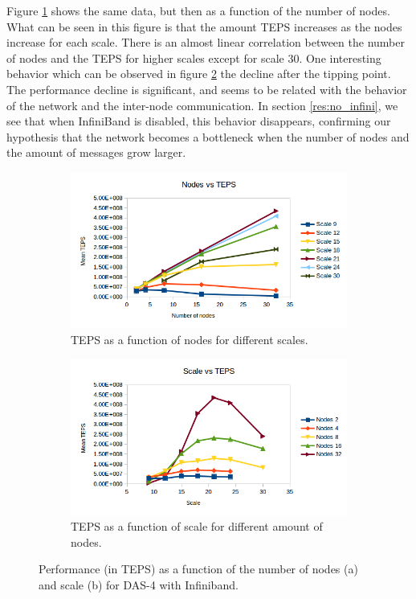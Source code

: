 Figure \ref{fig:nodes_no_val} shows the same data, but then as a function of the number of nodes. What can be seen in this figure is that the amount TEPS increases as the nodes increase for each scale. There is an almost linear correlation between the number of nodes and the TEPS for higher scales except for scale 30. One interesting behavior which can be observed in figure \ref{fig:scale_no_val} the decline after the tipping point. The performance decline is significant, and seems to be related with the behavior of the network and the inter-node communication. In section \ref{res:no_infini}, we see that when InfiniBand is disabled, this behavior disappears, confirming our hypothesis that the network becomes a bottleneck when the number of nodes and the amount of messages grow larger.

\begin{figure}[!h]
\centering
\begin{subfigure}{.5\textwidth}
  \centering
  \includegraphics[width=\linewidth]{images/nodes_no_val.png}
  \caption{TEPS as a function of nodes for different scales.}
  \label{fig:nodes_no_val}
\end{subfigure}%
\begin{subfigure}{.5\textwidth}
  \centering
  \includegraphics[width=\linewidth]{images/scale_no_val.png}
  \caption{TEPS as a function of scale for different amount of nodes.}
  \label{fig:scale_no_val}
\end{subfigure}
\caption{Performance (in TEPS) as a function of the number of nodes (a) and scale (b) for DAS-4 with Infiniband.}
\label{fig:das_no_val}
\end{figure}

